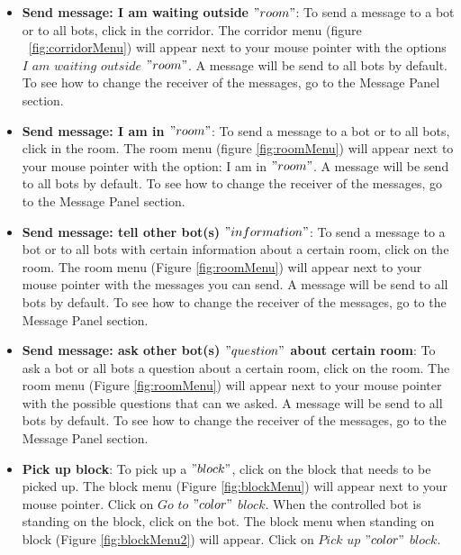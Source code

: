 \begin{itemize}
\item \textbf{Send message: I am waiting outside $"room"$}:
To send a message to a bot or to all bots, click in the corridor. The corridor menu (figure ~\ref{fig:corridorMenu}) will appear next to your mouse pointer with the options $I$ $am$ $waiting$ $outside$ $"room"$. A message will be send to all bots by default. To see how to change the receiver of the messages, go to the Message Panel section.

\item \textbf{Send message: I am in $"room"$}:
To send a message to a bot or to all bots, click in the room. The room menu (figure \ref{fig:roomMenu}) will appear next to your mouse pointer with the option: I am in $"room"$. A message will be send to all bots by default. To see how to change the receiver of the messages, go to the Message Panel section.

\item \textbf{Send message: tell other bot(s) $"information"$}:
To send a message to a bot or to all bots with certain information about a certain room, click on the room. The room menu (Figure \ref{fig:roomMenu}) will appear next to your mouse pointer with the messages you can send. A message will be send to all bots by default. To see how to change the receiver of the messages, go to the Message Panel section.

\item \textbf{Send message: ask other bot(s) $"question"$ about certain room}:
To ask a bot or all bots a question about a certain room, click on the room. The room menu (Figure \ref{fig:roomMenu}) will appear next to your mouse pointer with the possible questions that can we asked. A message will be send to all bots by default. To see how to change the receiver of the messages, go to the Message Panel section.

\item \textbf{Pick up block}:
To pick up a $"block"$, click on the block that needs to be picked up. The block menu (Figure \ref{fig:blockMenu}) will appear next to your mouse pointer. Click on $Go$ $to$ $"color"$ $block$. When the controlled bot is standing on the block, click on the bot. The block menu when standing on block (Figure \ref{fig:blockMenu2}) will appear. Click on $Pick$ $up$ $"color"$ $block$.


\end{itemize}
